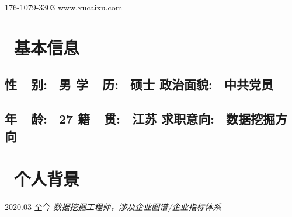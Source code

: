 \documentclass{resume}
\begin{document}











\medskip

    {176-1079-3303}    {www.xucaixu.com} 










\section{   \faHome  \  基本信息}
   \subsection{  \hspace{ 0.4cm }     \textbf{性\ \ 别}:    \ 男   
                        \hspace{ 3.2cm }     \textbf{学\ \ 历}:   \ 硕士 
                        \hspace{ 3.2cm }     \textbf{政治面貌}: \ 中共党员 }

   \subsection{  \hspace{ 0.4cm }     \textbf{年\ \ 龄}:     \ 27   
                        \hspace{ 3.2cm }     \textbf{籍\ \ 贯}:     \ 江苏 
                        \hspace{ 3.2cm }     \textbf{求职意向}:  \ 数据挖掘方向 }
  
\medskip










\section{   \faUser    \  个人背景}

                       {2020.03-至今}
   \faUserMd   \textit{   数据挖掘工程师，涉及企业图谱/企业指标体系 }
\end{document}
